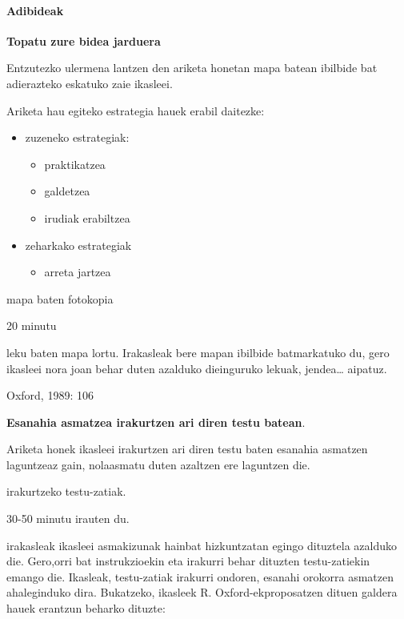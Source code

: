 \documentclass[]{book}
\providecommand{\tightlist}{%
  \setlength{\itemsep}{0pt}\setlength{\parskip}{0pt}}
\let\oldparagraph\paragraph
\renewcommand{\paragraph}[1]{\oldparagraph{#1}\mbox{}}
\begin{document}
\hypertarget{adibideak-1}{%
\paragraph{Adibideak}\label{adibideak-1}}

\textbf{Topatu zure bidea jarduera}

Entzutezko ulermena lantzen den ariketa honetan mapa batean ibilbide bat adierazteko eskatuko zaie ikasleei.

Ariketa hau egiteko estrategia hauek erabil daitezke:

\begin{itemize}
\tightlist
\item
  zuzeneko estrategiak:

  \begin{itemize}
  \tightlist
  \item
    praktikatzea
  \item
    galdetzea
  \item
    irudiak erabiltzea
  \end{itemize}
\item
  zeharkako estrategiak

  \begin{itemize}
  \tightlist
  \item
    arreta jartzea
  \end{itemize}
\end{itemize}

\begin{description}
\tightlist
\item[Baliabide materiala]
mapa baten fotokopia
\item[Denbora]
20 minutu
\item[Nola egin]
leku baten mapa lortu. Irakasleak bere mapan ibilbide batmarkatuko du, gero ikasleei nora joan behar duten azalduko dieinguruko lekuak, jendea\ldots{} aipatuz.
\end{description}

Oxford, 1989: 106

\textbf{Esanahia asmatzea irakurtzen ari diren testu batean}.

Ariketa honek ikasleei irakurtzen ari diren testu baten esanahia asmatzen laguntzeaz gain, nolaasmatu duten azaltzen ere laguntzen die.

\begin{description}
\tightlist
\item[Baliabide materiala]
irakurtzeko testu-zatiak.
\item[Denbora]
30-50 minutu irauten du.
\item[Nola egin]
irakasleak ikasleei asmakizunak hainbat hizkuntzatan egingo dituztela azalduko die.
Gero,orri bat instrukzioekin eta irakurri behar dituzten testu-zatiekin emango die.
Ikasleak, testu-zatiak irakurri ondoren, esanahi orokorra asmatzen ahaleginduko dira.
Bukatzeko, ikasleek R. Oxford-ekproposatzen dituen galdera hauek erantzun beharko dituzte:
\end{description}
\end{document}
